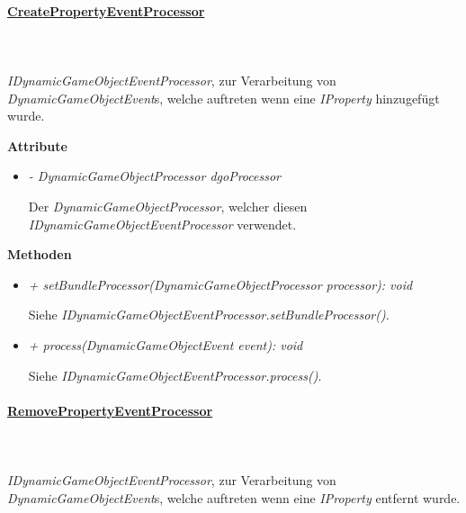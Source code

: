         \paragraph{\underline{CreatePropertyEventProcessor}} \mbox{}\\
        \\
        \textit{IDynamicGameObjectEventProcessor}, zur Verarbeitung von \textit{DynamicGameObjectEvent}s, welche auftreten wenn eine \textit{IProperty} hinzugefügt wurde.

            \textbf{Attribute}
            \begin{itemize}
                \item  \textit{- DynamicGameObjectProcessor dgoProcessor}
                    \begin{leftbar}[0.9\linewidth]
                        Der \textit{DynamicGameObjectProcessor}, welcher diesen \textit{IDynamicGameObjectEventProcessor} verwendet.
                    \end{leftbar}
            \end{itemize}
            \textbf{Methoden}
            \begin{itemize}
                \item \textit{+ setBundleProcessor(DynamicGameObjectProcessor processor): void}
                    \begin{leftbar}[0.9\linewidth]
                        Siehe \textit{IDynamicGameObjectEventProcessor.setBundleProcessor()}.
                    \end{leftbar}
                \item \textit{+ process(DynamicGameObjectEvent event): void}
                    \begin{leftbar}[0.9\linewidth]
                        Siehe \textit{IDynamicGameObjectEventProcessor.process()}.
                    \end{leftbar}
            \end{itemize}
        
        \pagebreak
        \paragraph{\underline{RemovePropertyEventProcessor}} \mbox{}\\
        \\
        \textit{IDynamicGameObjectEventProcessor}, zur Verarbeitung von \textit{DynamicGameObjectEvent}s, welche auftreten wenn eine \textit{IProperty} entfernt wurde.

